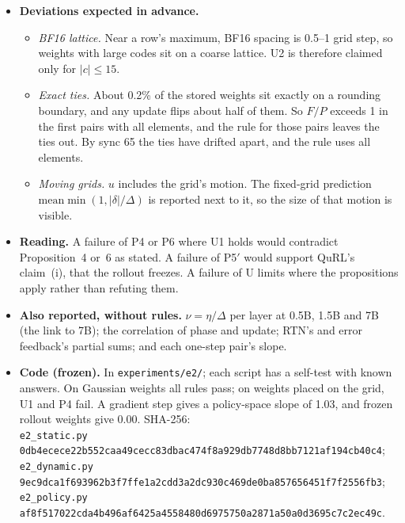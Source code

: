 \documentclass[11pt]{article}
\begin{document}
\begin{itemize}
\item \textbf{Deviations expected in advance.}
  \begin{itemize}
  \item \emph{BF16 lattice.} Near a row's maximum, BF16 spacing is 0.5--1 grid step, so weights with large codes sit on a coarse lattice. U2 is therefore claimed only for $|c|\le15$.
  \item \emph{Exact ties.} About 0.2\% of the stored weights sit exactly on a rounding boundary, and any update flips about half of them. So $F/P$ exceeds 1 in the first pairs with all elements, and the rule for those pairs leaves the ties out. By sync 65 the ties have drifted apart, and the rule uses all elements.
  \item \emph{Moving grids.} $u$ includes the grid's motion. The fixed-grid prediction $\mathrm{mean}\min(1,|\delta|/\Delta)$ is reported next to it, so the size of that motion is visible.
  \end{itemize}
\item \textbf{Reading.} A failure of P4 or P6 where U1 holds would contradict Proposition~4 or~6 as stated. A failure of P5$'$ would support QuRL's claim~(i), that the rollout freezes. A failure of U limits where the propositions apply rather than refuting them.
\item \textbf{Also reported, without rules.} $\nu=\eta/\Delta$ per layer at 0.5B, 1.5B and 7B (the link to 7B); the correlation of phase and update; RTN's and error feedback's partial sums; and each one-step pair's slope.
\item \textbf{Code (frozen).} In \texttt{experiments/e2/}; each script has a self-test with known answers. On Gaussian weights all rules pass; on weights placed on the grid, U1 and P4 fail. A gradient step gives a policy-space slope of 1.03, and frozen rollout weights give 0.00. SHA-256:\\
\texttt{e2\_static.py} \texttt{\small 0db4ecece22b552caa49cecc83dbac474f8a929db7748d8bb7121af194cb40c4};\\
\texttt{e2\_dynamic.py} \texttt{\small 9ec9dca1f693962b3f7ffe1a2cdd3a2dc930c469de0ba857656451f7f2556fb3};\\
\texttt{e2\_policy.py} \texttt{\small af8f517022cda4b496af6425a4558480d6975750a2871a50a0d3695c7c2ec49c}.
\end{itemize}
\end{document}
